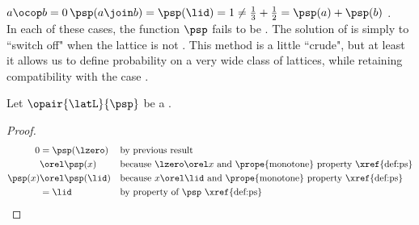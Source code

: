 \begin{remark}
\\\indentx$a\ocop b=0$\qquad$\psp(a\join b)=\psp(\lid)=1\neq\frac{1}{3}+\frac{1}{2}=\psp(a)+\psp(b)$ .\\
In each of these cases, the function $\psp$ fails to be .
The solution of  is simply to ``switch off"  when the lattice is not .
This method is a little ``crude", but at least it allows us to define probability on a very wide class of lattices,
while retaining compatibility with the  case .
\end{remark}

\begin{proposition}
\label{prop:ps_01}
Let $\opair{\latL}{\psp}$ be a  .
\end{proposition}
\begin{proof}
  \begin{align*}
    0
      &= \psp(\lzero)
      && \text{by previous result}
    \\&\orel \psp(x)
      && \text{because $\lzero\orel x$ and \prope{monotone} property \xref{def:ps}}
    \\
    \psp(x)
      &\orel \psp(\lid)
      && \text{because $x\orel\lid$ and \prope{monotone} property \xref{def:ps}}
    \\&= \lid
      && \text{by property of $\psp$ \xref{def:ps}}
  \end{align*}
\end{proof}

